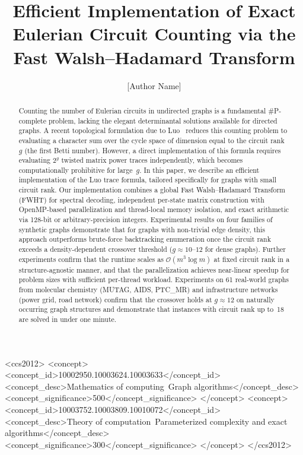\documentclass[acmsmall,review]{acmart}
\title{Efficient Implementation of Exact Eulerian Circuit Counting via the Fast Walsh--Hadamard Transform}
\author{[Author Name]}
\affiliation{%
  \institution{[Institution]}
  \city{[City]}
  \country{[Country]}
}
\newcommand{\bigO}{\mathcal{O}}
\begin{document}
\begin{abstract}
		Counting the number of Eulerian circuits in undirected graphs is a fundamental \#P-complete problem, lacking the elegant determinantal solutions available for directed graphs. A recent topological formulation due to Luo~\cite{Luo2025} reduces this counting problem to evaluating a character sum over the cycle space of dimension equal to the circuit rank $g$ (the first Betti number). However, a direct implementation of this formula requires evaluating $2^g$ twisted matrix power traces independently, which becomes computationally prohibitive for large~$g$. In this paper, we describe an efficient implementation of the Luo trace formula, tailored specifically for graphs with small circuit rank. Our implementation combines a global Fast Walsh--Hadamard Transform (FWHT) for spectral decoding, independent per-state matrix construction with OpenMP-based parallelization and thread-local memory isolation, and exact arithmetic via 128-bit or arbitrary-precision integers. Experimental results on four families of synthetic graphs demonstrate that for graphs with non-trivial edge density, this approach outperforms brute-force backtracking enumeration once the circuit rank exceeds a density-dependent crossover threshold ($g \approx 10$--$12$ for dense graphs). Further experiments confirm that the runtime scales as $\bigO(m^3 \log m)$ at fixed circuit rank in a structure-agnostic manner, and that the parallelization achieves near-linear speedup for problem sizes with sufficient per-thread workload. Experiments on 61 real-world graphs from molecular chemistry (MUTAG, AIDS, PTC\_MR) and infrastructure networks (power grid, road network) confirm that the crossover holds at $g \approx 12$ on naturally occurring graph structures and demonstrate that instances with circuit rank up to~18 are solved in under one minute.
	\end{abstract}

\begin{CCSXML}
<ccs2012>
<concept>
<concept_id>10002950.10003624.10003633</concept_id>
<concept_desc>Mathematics of computing~Graph algorithms</concept_desc>
<concept_significance>500</concept_significance>
</concept>
<concept>
<concept_id>10003752.10003809.10010072</concept_id>
<concept_desc>Theory of computation~Parameterized complexity and exact algorithms</concept_desc>
<concept_significance>300</concept_significance>
</concept>
</ccs2012>
\end{CCSXML}

\end{document}
